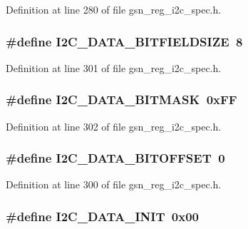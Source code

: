 Definition at line 280 of file gsn\_\-reg\_\-i2c\_\-spec.h.

\hypertarget{a00558_ac2d18646ada8e52aa14a7a637e2a5b0a}{
\subsubsection[{I2C\_\-DATA\_\-BITFIELDSIZE}]{\setlength{\rightskip}{0pt plus 5cm}\#define I2C\_\-DATA\_\-BITFIELDSIZE~8}}
\label{a00558_ac2d18646ada8e52aa14a7a637e2a5b0a}


Definition at line 301 of file gsn\_\-reg\_\-i2c\_\-spec.h.

\hypertarget{a00558_af2b064c86fc0a754a497a2eb7ef47b7c}{
\subsubsection[{I2C\_\-DATA\_\-BITMASK}]{\setlength{\rightskip}{0pt plus 5cm}\#define I2C\_\-DATA\_\-BITMASK~0xFF}}
\label{a00558_af2b064c86fc0a754a497a2eb7ef47b7c}


Definition at line 302 of file gsn\_\-reg\_\-i2c\_\-spec.h.

\hypertarget{a00558_ae541003460940c1afc89be6675f78185}{
\subsubsection[{I2C\_\-DATA\_\-BITOFFSET}]{\setlength{\rightskip}{0pt plus 5cm}\#define I2C\_\-DATA\_\-BITOFFSET~0}}
\label{a00558_ae541003460940c1afc89be6675f78185}


Definition at line 300 of file gsn\_\-reg\_\-i2c\_\-spec.h.

\hypertarget{a00558_a28bf02f9cb53f0558cdaf6de566fca64}{
\subsubsection[{I2C\_\-DATA\_\-INIT}]{\setlength{\rightskip}{0pt plus 5cm}\#define I2C\_\-DATA\_\-INIT~0x00}}
\label{a00558_a28bf02f9cb53f0558cdaf6de566fca64}


